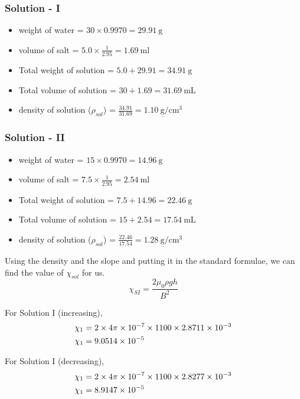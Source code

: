 \documentclass[../main.tex]{subfiles}
\begin{document}
\subsubsection*{Solution - I}
\begin{itemize}
	\item weight of water = $30 \times 0.9970 = \SI{29.91}{\gram}$
	\item volume of salt = $5.0 \times \frac{1}{2.95} = \SI{1.69}{\milli\litre}$
	\item Total weight of solution = $5.0 + 29.91 = \SI{34.91}{\gram}$
	\item Total volume of solution = $30 + 1.69 = \SI{31.69}{\milli\liter}$
	\item density of solution ($\rho_{sol}$) = $\frac{34.91}{31.69} = \underline{\SI{1.10}{\gram\per\centi\meter\cubed}}$
\end{itemize}

\subsubsection*{Solution - II}
\begin{itemize}
	\item weight of water = $15 \times 0.9970 = \SI{14.96}{\gram}$
	\item volume of salt = $7.5 \times \frac{1}{2.95} = \SI{2.54}{\milli\litre}$
	\item Total weight of solution = $7.5 + 14.96 = \SI{22.46}{\gram}$
	\item Total volume of solution = $15 + 2.54 = \SI{17.54}{\milli\liter}$
	\item density of solution ($\rho_{sol}$) = $\frac{22.46}{17.54} = \underline{\SI{1.28}{\gram\per\centi\meter\cubed}}$
\end{itemize}


Using the density and the slope and putting it in the standard formulae, we can find the value of $\chi_{sol}$ for us.
$$ \chi_{SI} = \frac{2\mu_0 \rho g h}{B^2} $$

For Solution I (increasing),
\begin{align*}
	\chi_1 &= 2 \times 4 \pi \times \SI{e-7}{} \times 1100 \times \SI{2.8711e-03}{} \\
	\chi_1 &= \SI{9.0514e-05}{}
\end{align*}

For Solution I (decreasing),
\begin{align*}
	\chi_1 &= 2 \times 4 \pi \times \SI{e-7}{} \times 1100 \times \SI{2.8277e-03}{} \\
\chi_1 &= \SI{8.9147e-05}{}
\end{align*}
\end{document}
